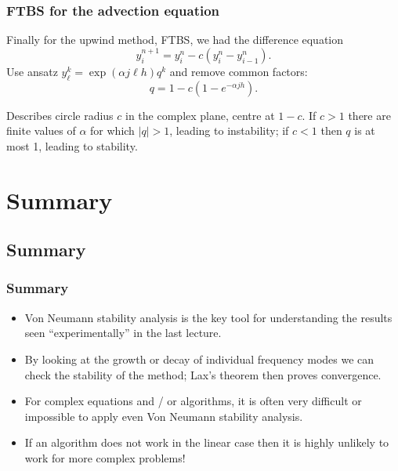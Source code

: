 \documentclass{beamer}
\begin{document}
\begin{frame}
  \frametitle{FTBS for the advection equation}
  
  Finally for the upwind method, FTBS, we had the difference equation
  \begin{equation*}
    y_i^{n+1} = y_i^n - c \left( y_{i}^n - y_{i-1}^n \right).
  \end{equation*}
  Use ansatz $y_{\ell}^k =  \exp (\alpha j \ell h) q^k$
  and remove common factors:
  \begin{equation*}
    q = 1 - c \left( 1 - e^{-\alpha j h} \right). 
  \end{equation*} \pause

  Describes circle radius $c$ in the complex plane, centre at $1 -
  c$. \pause If $c > 1$ there are finite values of $\alpha$ for which
  $|q| > 1$, leading to instability; if $c < 1$ then $q$ is at most 1,
  leading to stability.

\end{frame}

\section{Summary}

\subsection{Summary}

\begin{frame}
  \frametitle{Summary}
  
  \begin{itemize}
  \item Von Neumann stability analysis is the key tool for
    understanding the results seen ``experimentally'' in the last
    lecture.
  \item By looking at the growth or decay of individual frequency
    modes we can check the stability of the method; Lax's theorem then
    proves convergence.
  \item For complex equations and / or algorithms, it is often very
    difficult or impossible to apply even Von Neumann stability
    analysis.
  \item If an algorithm does not work in the linear case then it is
    highly unlikely to work for more complex problems!
  \end{itemize}
   
\end{frame}
\end{document}
